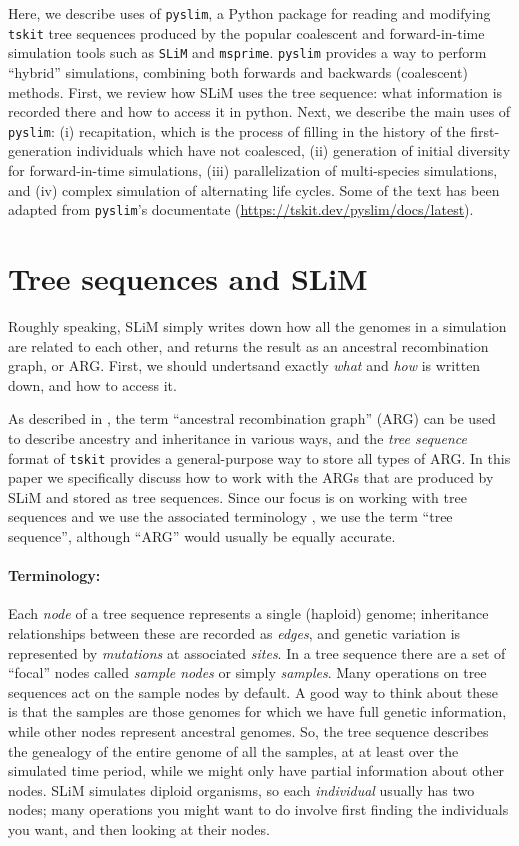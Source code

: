 \documentclass[12pt]{article}
\newcommand{\msprime}[0]{\texttt{msprime}\xspace}
\newcommand{\tskit}[0]{\texttt{tskit}\xspace}
\newcommand{\slim}[0]{\texttt{SLiM}\xspace}
\newcommand{\pyslim}[0]{\texttt{pyslim}\xspace}
\begin{document}
Here, we describe uses of \pyslim, a Python package for reading and modifying \tskit tree sequences produced by
the popular coalescent and forward-in-time simulation tools such as \slim and \msprime.
\pyslim provides a way to perform ``hybrid'' simulations, combining both forwards and backwards (coalescent) methods.
First, we review how SLiM uses the tree sequence:
what information is recorded there and how to access it in python.
Next, we describe the main uses of \pyslim:
(i) recapitation, which is the process of filling in the history of the first-generation individuals which have not coalesced,
(ii) generation of initial diversity for forward-in-time simulations,
(iii) parallelization of multi-species simulations, and (iv) complex simulation of alternating life cycles.
Some of the text has been adapted from \pyslim's documentate
(\url{https://tskit.dev/pyslim/docs/latest}).

\section{Tree sequences and SLiM}

Roughly speaking, SLiM simply writes down
how all the genomes in a simulation are related to each other,
and returns the result as an ancestral recombination graph, or ARG.
First, we should undertsand exactly \emph{what} and \emph{how} is written down,
and how to access it.

As described in \citet{wong},
the term ``ancestral recombination graph'' (ARG) can be used to describe ancestry and inheritance
in various ways,
and the \emph{tree sequence} format of \tskit
provides a general-purpose way to store all types of ARG.
In this paper we specifically discuss how to work with the ARGs that are produced by SLiM
and stored as tree sequences.
Since our focus is on working with tree sequences
and we use the associated terminology \citet{XXX},
we use the term ``tree sequence'',
although ``ARG'' would usually be equally accurate.

\paragraph{Terminology:}
Each \textit{node} of a tree sequence represents a single (haploid) genome;
inheritance relationships between these are recorded as \textit{edges},
and genetic variation is represented by \textit{mutations} at associated \textit{sites}.
In a tree sequence there are
a set of ``focal'' nodes called \textit{sample nodes} or simply \textit{samples}.
Many operations on tree sequences act on the sample nodes by default.
A good way to think about these is that the samples are those genomes
for which we have full genetic information,
while other nodes represent ancestral genomes.
So, the tree sequence describes the genealogy of the
entire genome of all the samples, at at least over the simulated time period,
while we might only have partial information about other nodes.
SLiM simulates diploid organisms, so each \textit{individual} usually has two nodes;
many operations you might want to do involve first finding the individuals you want,
and then looking at their nodes.
\end{document}
